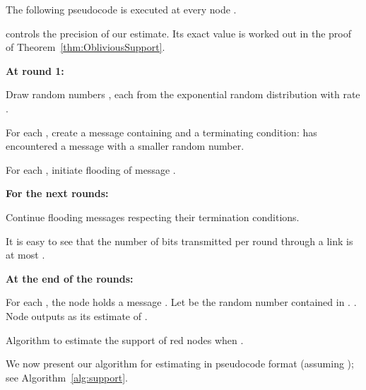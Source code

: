 \documentclass[leqno,11pt]{article}
\begin{document}
\begin{algorithm}[h]
  \begin{algorithmic}[1]
   \footnotesize
  \EMPTY The following pseudocode is executed at every node .
  
  \EMPTY  controls the precision of our estimate. Its exact value is worked
out in the proof of Theorem~\ref{thm:ObliviousSupport}.
 
   \EMPTY 
  \item[\bf At round 1:]
  
  \STATE  Draw  random numbers , each from the exponential random distribution with rate
. 



\STATE For each , create a message  containing  and a terminating condition: {\sc has encountered
a message  with a smaller random number}.



\STATE For each , initiate flooding of message .



   \EMPTY 
  \item[\bf For the next  rounds:]
  
\STATE Continue flooding messages respecting their termination conditions.

\COMMENT It is easy to see that the number of bits transmitted per round through a link is at most .

 \EMPTY 
  \item[\bf At the end of the  rounds:]
  
   \STATE For each , the node  holds a message . Let  be the random number contained in . 
   \STATE . \label{lno:bars}
   \STATE Node  outputs  as its estimate of .
    \end{algorithmic}
  \caption{Algorithm to estimate the support  of red nodes when .}\label{alg:support}
\end{algorithm}
\normalsize




We now present our algorithm for estimating  in pseudocode format (assuming ); see Algorithm~\ref{alg:support}. 
\end{document}
